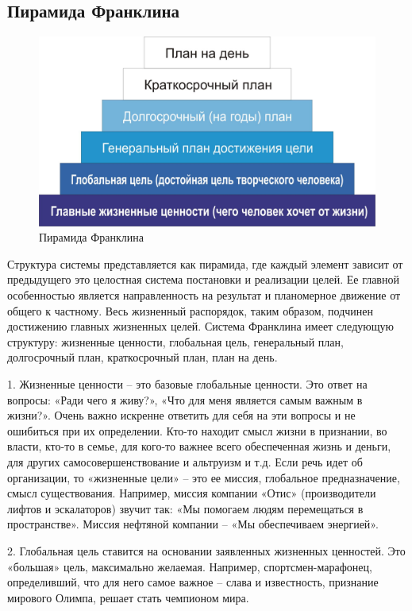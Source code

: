 \subsection{Пирамида Франклина}

\label{page:domain:piramida_franklina}
\begin{figure}
\centering
  \includegraphics[scale=0.85]{images/franklin_piramida.jpg}
  \caption{ Пирамида Франклина }
  \label{fig:domain:franklin}
\end{figure}


Структура системы представляется как пирамида, где каждый элемент зависит от предыдущего это целостная система постановки и реализации целей. Ее главной особенностью является направленность на результат и планомерное движение от общего к частному. Весь жизненный распорядок, таким образом, подчинен достижению главных жизненных целей. Система Франклина имеет следующую структуру: жизненные ценности, глобальная цель, генеральный план, долгосрочный план, краткосрочный план, план на день. 


1. Жизненные ценности – это базовые глобальные ценности. Это ответ на вопросы: «Ради чего я живу?», «Что для меня является самым важным в жизни?». Очень важно искренне ответить для себя на эти вопросы и не ошибиться при их определении. Кто-то находит смысл жизни в признании, во власти, кто-то в семье, для кого-то важнее всего обеспеченная жизнь и деньги, для других самосовершенствование и альтруизм и т.д. Если речь идет об организации, то «жизненные цели» – это ее миссия, глобальное предназначение, смысл существования. Например, миссия компании «Отис» (производители лифтов и эскалаторов) звучит так: «Мы помогаем людям перемещаться в пространстве». Миссия нефтяной компании – «Мы обеспечиваем энергией». 

2. Глобальная цель ставится на основании заявленных жизненных ценностей. Это «большая» цель, максимально желаемая. Например, спортсмен-марафонец, определивший, что для него самое важное – слава и известность, признание мирового Олимпа, решает стать чемпионом мира. 

